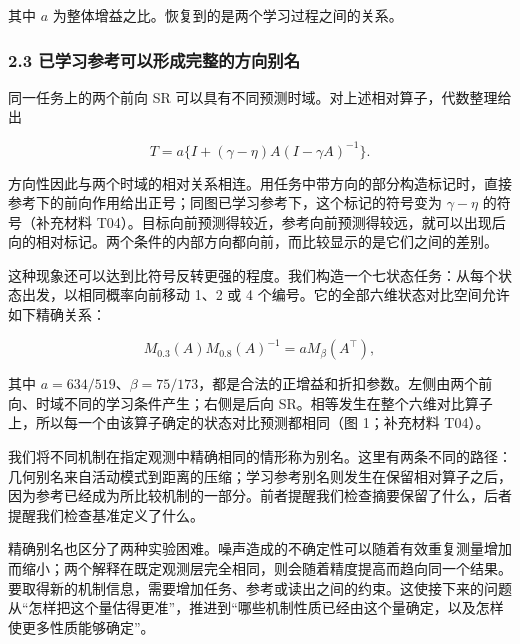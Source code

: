 \documentclass[11pt,a4paper]{article}
\begin{document}
其中 \(a\) 为整体增益之比。恢复到的是两个学习过程之间的关系。

\subsubsection{2.3
已学习参考可以形成完整的方向别名}\label{ux5df2ux5b66ux4e60ux53c2ux8003ux53efux4ee5ux5f62ux6210ux5b8cux6574ux7684ux65b9ux5411ux522bux540d}

\par
\noindent\begin{minipage}{\linewidth}

同一任务上的两个前向 SR
可以具有不同预测时域。对上述相对算子，代数整理给出

\[
T=a\{I+(\gamma-\eta)A(I-\gamma A)^{-1}\}.
\]

\end{minipage}\par

方向性因此与两个时域的相对关系相连。用任务中带方向的部分构造标记时，直接参考下的前向作用给出正号；同图已学习参考下，这个标记的符号变为
\(\gamma-\eta\) 的符号（补充材料
T04）。目标向前预测得较近，参考向前预测得较远，就可以出现后向的相对标记。两个条件的内部方向都向前，而比较显示的是它们之间的差别。

\par
\noindent\begin{minipage}{\linewidth}

这种现象还可以达到比符号反转更强的程度。我们构造一个七状态任务：从每个状态出发，以相同概率向前移动
1、2 或 4 个编号。它的全部六维状态对比空间允许如下精确关系：

\[
M_{0.3}(A)M_{0.8}(A)^{-1}
=aM_\beta(A^\top),
\]

\end{minipage}\par

其中
\(a=634/519\)、\(\beta=75/173\)，都是合法的正增益和折扣参数。左侧由两个前向、时域不同的学习条件产生；右侧是后向
SR。相等发生在整个六维对比算子上，所以每一个由该算子确定的状态对比预测都相同（图
1；补充材料 T04）。

我们将不同机制在指定观测中精确相同的情形称为别名。这里有两条不同的路径：几何别名来自活动模式到距离的压缩；学习参考别名则发生在保留相对算子之后，因为参考已经成为所比较机制的一部分。前者提醒我们检查摘要保留了什么，后者提醒我们检查基准定义了什么。

精确别名也区分了两种实验困难。噪声造成的不确定性可以随着有效重复测量增加而缩小；两个解释在既定观测层完全相同，则会随着精度提高而趋向同一个结果。要取得新的机制信息，需要增加任务、参考或读出之间的约束。这使接下来的问题从“怎样把这个量估得更准”，推进到“哪些机制性质已经由这个量确定，以及怎样使更多性质能够确定”。
\end{document}
